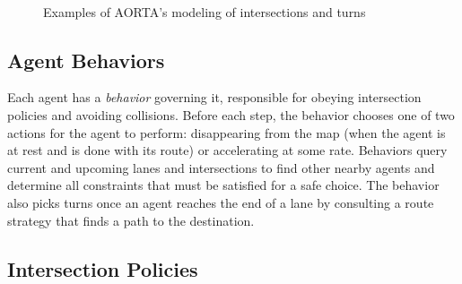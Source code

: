 \documentclass[letterpaper, 10 pt, conference]{ieeeconf}  %
\begin{document}
\begin{figure}[h]
  \centering
  ~ %
  \caption{Examples of AORTA's modeling of intersections and turns}
  \vspace{-15pt}
\end{figure}

\subsection{Agent Behaviors}

Each agent has a \emph{behavior} governing it, responsible for obeying
intersection policies and avoiding collisions. Before each step, the behavior
chooses one of two actions for the agent to perform: disappearing from the map
(when the agent is at rest and is done with its route) or accelerating at some
rate. Behaviors query current and upcoming lanes and intersections to find
other nearby agents and determine all constraints that must be satisfied for a
safe choice. The behavior also picks turns once an agent reaches the end of a
lane by consulting a route strategy that finds a path to the destination.

\subsection{Intersection Policies}
\label{sec:policies}
\end{document}
